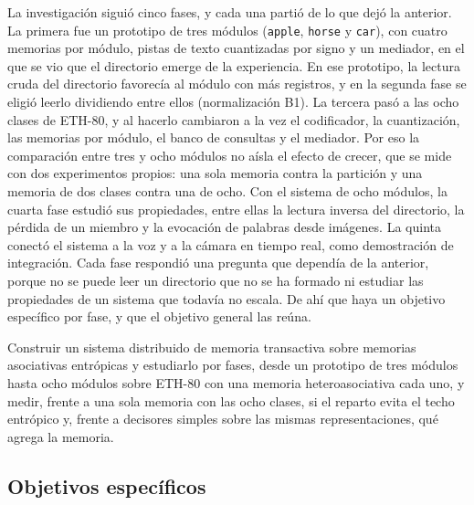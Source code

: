 La investigación siguió cinco fases, y cada una partió de lo que dejó la anterior.
La primera fue un prototipo de tres módulos (\texttt{apple}, \texttt{horse} y
\texttt{car}), con cuatro memorias por módulo, pistas de texto cuantizadas por signo y un
mediador, en el que se vio que el directorio emerge de la experiencia.
En ese prototipo, la lectura cruda del directorio favorecía al módulo con más registros,
y en la segunda fase se eligió leerlo dividiendo entre ellos (normalización B1).
La tercera pasó a las ocho clases de ETH-80, y al hacerlo cambiaron a la vez el
codificador, la cuantización, las memorias por módulo, el banco de consultas y el
mediador.
Por eso la comparación entre tres y ocho módulos no aísla el efecto de crecer, que se
mide con dos experimentos propios: una sola memoria contra la partición y una memoria de
dos clases contra una de ocho.
Con el sistema de ocho módulos, la cuarta fase estudió sus propiedades, entre ellas la
lectura inversa del directorio, la pérdida de un miembro y la evocación de palabras
desde imágenes.
La quinta conectó el sistema a la voz y a la cámara en tiempo real, como demostración
de integración.
Cada fase respondió una pregunta que dependía de la anterior, porque no se puede leer un
directorio que no se ha formado ni estudiar las propiedades de un sistema que todavía no
escala.
De ahí que haya un objetivo específico por fase, y que el objetivo general las reúna.

Construir un sistema distribuido de memoria transactiva sobre memorias asociativas
entrópicas y estudiarlo por fases, desde un prototipo de tres módulos hasta ocho módulos
sobre ETH-80 con una memoria heteroasociativa cada uno, y medir, frente a una sola
memoria con las ocho clases, si el reparto evita el techo entrópico y, frente a decisores
simples sobre las mismas representaciones, qué agrega la memoria.

\subsection{Objetivos específicos}

